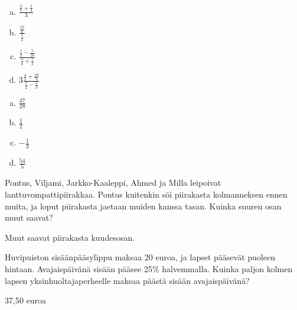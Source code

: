 \begin{tehtava} %

\begin{enumerate}[a)]
	\item $ \frac{\frac{3}{7} + \frac{5}{4}}{3}$
	\item $ \frac{\frac{10}{8}}{\frac{5}{2}}$
	\item $ \frac{\frac{1}{3} - \frac{5}{10}}{\frac{3}{4} + \frac{1}{2}}$
	\item $ 3\frac{\frac{4}{2} + \frac{10}{4}}{\frac{3}{2} - \frac{2}{3}}$
\end{enumerate}
    \begin{vastaus}		
		\begin{enumerate}[a)]
			\item $\frac{47}{28}$
			\item $\frac{1}{2}$
			\item $-\frac{1}{3}$
			\item $\frac{54}{5}$
		\end{enumerate}
    \end{vastaus}
\end{tehtava}

\begin{tehtava} %
    Pontus, Viljami, Jarkko-Kaaleppi, Ahmed ja Milla leipoivat lanttuvompattipiirakkaa.
    Pontus kuitenkin söi piirakasta kolmanneksen ennen muita, ja loput piirakasta
    jaetaan muiden kanssa tasan. Kuinka suuren osan muut saavat?
    
    \begin{vastaus}
        Muut saavat piirakasta kuudesosan.
    \end{vastaus}
\end{tehtava}

\begin{tehtava} %
    Huvipuiston sisäänpääsylippu maksaa 20 euroa, ja lapset pääsevät puoleen
    hintaan. Avajaispäivänä sisään pääsee 25\% halvemmalla. Kuinka paljon kolmen
    lapsen yksinhuoltajaperheelle maksaa päästä sisään avajaispäivänä?
    
    \begin{vastaus}
        37,50 euroa
    \end{vastaus}
\end{tehtava}
